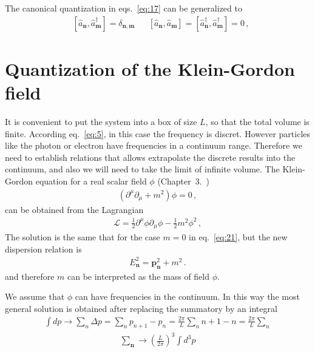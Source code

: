 \begin{frame}
The canonical quantization in eqs.~\eqref{eq:17}  can be  generalized to 
\begin{align}
  &\left[\widehat{a}_\mathbf{n},\widehat{a}_\mathbf{m}^\dagger\right]=
\delta_{\mathbf{n},\mathbf{m}}&
&\left[\widehat{a}_\mathbf{n},\widehat{a}_\mathbf{m}\right]=
\left[\widehat{a}_\mathbf{n}^\dagger,\widehat{a}_\mathbf{m}^\dagger\right]=0\,,
\end{align}
\end{frame}
\section{Quantization of the Klein-Gordon field}
\label{sec:quant-klein-gord}
\begin{frame}
It is convenient to put the system into a box of size $L$, so that the total volume is finite. According eq.~\eqref{eq:5}, in this case the frequency is discret. However particles like the photon or electron have frequencies in a continuum range. Therefore we need to establish relations that allows extrapolate the discrete results into the continuum, and also we will need to take the limit of  infinite volume. The Klein-Gordon equation for a real scalar field $\phi$ (Chapter~3.~\cite{lsm})
\begin{align}
  (\partial^\mu\partial_\mu+m^2)\phi=0\,,
\end{align}
can be obtained from the Lagrangian
\begin{align}
\label{eq:22}
  \mathcal{L}=\tfrac{1}{2}\partial^\mu\phi\partial_\mu\phi-\tfrac{1}{2}m^2\phi^2\,,
\end{align}
The solution is the same that for the case $m=0$ in eq.~\eqref{eq:21}, but 
the new dispersion relation is
\begin{align}
  E_{\mathbf{n}}^2=\mathbf{p}^2_{\mathbf{n}}+m^2\,.
\end{align}
and therefore $m$ can be interpreted as the mass of field $\phi$.

We assume that $\phi$ can have frequencies in the continuum. 
In this way the most general solution is obtained after replacing the summatory  by an integral
\begin{align}
  \int d p\to \sum_n \Delta p=\sum_n p_{n+1}-p_{n}=\frac{2\pi}{L}\sum_n n+1-n=\frac{2\pi}{L}\sum_n
\end{align}
\begin{align}
\label{eq:23}
 \sum_\mathbf{n} \to \left(\frac{L}{2\pi}\right)^3\int d^3p
\end{align}


\end{frame}
